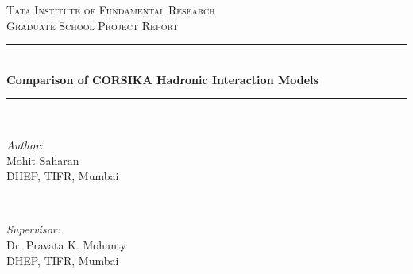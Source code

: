 \documentclass[12pt]{article}
\begin{document}
\begin{titlepage}

\newcommand{\HRule}{\rule{\linewidth}{0.5mm}} %

\center %
 

\textsc{\LARGE Tata Institute of Fundamental Research}\\[1.5cm] 
\textsc{\large Graduate School Project Report}\\[0.5cm] %
\vspace{4cm}

\HRule \\[0.4cm]
{ \huge \bfseries Comparison of CORSIKA Hadronic Interaction Models}\\[0.4cm] %
\HRule \\[1.5cm]
 

\vspace{4cm}

\begin{minipage}{0.4\textwidth}
\begin{flushleft} \large
\emph{Author:}\\
Mohit Saharan\\
DHEP, TIFR, Mumbai
\end{flushleft}
\end{minipage}
~
\begin{minipage}{0.4\textwidth}
\begin{flushright} \large
\emph{Supervisor:} \\
Dr. Pravata K. Mohanty\\
DHEP, TIFR, Mumbai
\end{flushright}
\end{minipage}\\[2cm]


\end{titlepage}
\end{document}
